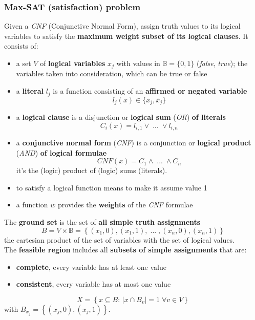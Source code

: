\subsubsection{Max-SAT (satisfaction) problem}
Given a \textit{CNF} (Conjunctive Normal Form), assign truth values to its logical variables to satisfy the \textbf{maximum weight subset of its logical clauses}. It consists of: 
\begin{itemize}
	\item a set $V$ of \textbf{logical variables} $x_j$ with values in $\mathbb{B} = \{0, 1\}$ (\textit{false}, \textit{true}); the variables taken into consideration, which can be true or false
	\item a \textbf{literal} $l_j$ is a function consisting of an \textbf{affirmed or negated variable}
	$$ l_j (x) \in \{x_j, \overline{x}_j\}$$
	\item a \textbf{logical clause} is a disjunction or \textbf{logical sum} (\textit{OR}) \textbf{of literals}
	$$ C_i (x) = l_{i,1} \vee \; ... \; \vee l_{i,n}$$
	\item a \textbf{conjunctive normal form} (\textit{CNF}) is a conjunction or \textbf{logical product} (\textit{AND}) \textbf{of logical formulae}
	$$ CNF (x) = C_1 \wedge \; ... \; \wedge C_n $$
	it's the (logic) product of (logic) sums (literals).\\
	\item to satisfy a logical function means to make it assume value 1
	\item a function $w$ provides the \textbf{weights} of the \textit{CNF} formulae
\end{itemize}

The \textbf{ground set} is the set of \textbf{all simple truth assignments}
$$ B = V \times \mathbb{B} = \left\{(x_1, 0), (x_1, 1), \; ... \; , (x_n, 0), (x_n, 1)\right\}$$
the cartesian product of the set of variables with the set of logical values.\\

The \textbf{feasible region} includes all \textbf{subsets of simple assignments} that are:
\begin{itemize}
	\item \textbf{complete}, every variable has at least one value
	\item \textbf{consistent}, every variable has at most one value
\end{itemize}
$$ X = \left\{x \subseteq B : \, |x \cap B_v| = 1 \; \forall v \in V \right\}$$
with $B_{x_j} = \left\{(x_j, 0), (x_j, 1)\right\}$.\\

